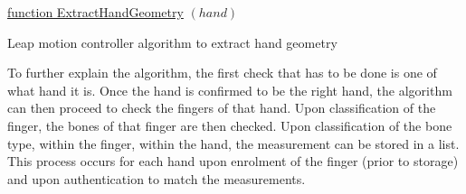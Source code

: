 \begin{algorithm}

    \underline{function ExtractHandGeometry} $(hand)$\;
         
    
    \caption{Leap motion controller algorithm to extract hand geometry}
\end{algorithm}



To further explain the algorithm, the first check that has to be done is one of what hand it is. Once the hand is confirmed to be the right hand, the algorithm can then proceed to check the fingers of that hand. Upon classification of the finger, the bones of that finger are then checked. Upon classification of the bone type, within the finger, within the hand, the measurement can be stored in a list. This process occurs for each hand upon enrolment of the finger (prior to storage) and upon authentication to match the measurements.

